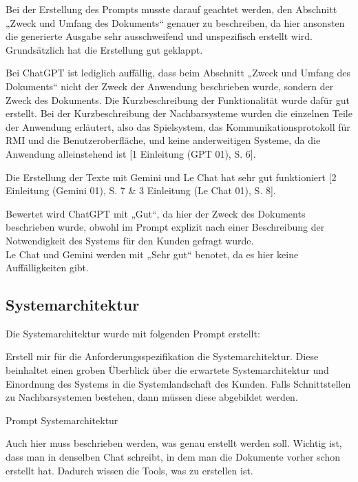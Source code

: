 Bei der Erstellung des Prompts musste darauf geachtet werden, den Abschnitt „Zweck und Umfang des Dokuments“ genauer zu beschreiben, da hier 
ansonsten die generierte Ausgabe sehr ausschweifend und unspezifisch erstellt wird. Grundsätzlich hat die Erstellung gut geklappt.

Bei ChatGPT ist lediglich auffällig, dass beim Abschnitt „Zweck und Umfang des Dokuments“ nicht der Zweck der Anwendung beschrieben wurde, 
sondern der Zweck des Dokuments. Die Kurzbeschreibung der Funktionalität wurde dafür gut erstellt. Bei der Kurzbeschreibung der 
Nachbarsysteme wurden die einzelnen Teile der Anwendung erläutert, also das Spielsystem, das Kommunikationsprotokoll für RMI und die 
Benutzeroberfläche, und keine anderweitigen Systeme, da die Anwendung alleinstehend ist [1 Einleitung (GPT 01), S. 6].

Die Erstellung der Texte mit Gemini und Le Chat hat sehr gut funktioniert [2 Einleitung (Gemini 01), S. 7 \& 3 Einleitung (Le Chat 01), S. 8].

Bewertet wird ChatGPT mit „Gut“, da hier der Zweck des Dokuments beschrieben wurde, obwohl im Prompt explizit nach einer Beschreibung der 
Notwendigkeit des Systems für den Kunden gefragt wurde.\\
Le Chat und Gemini werden mit „Sehr gut“ benotet, da es hier keine Auffälligkeiten gibt.

\subsection*{Systemarchitektur}

Die Systemarchitektur wurde mit folgenden Prompt erstellt:

\begin{prompt}[H]
    \begin{tcolorbox}[colback=gray!20, colframe=gray!20, boxrule=0pt, sharp corners] 
        Erstell mir für die Anforderungsspezifikation die Systemarchitektur. Diese beinhaltet einen groben Überblick über die erwartete Systemarchitektur 
        und Einordnung des Systems in die Systemlandschaft des Kunden. Falls Schnittstellen zu Nachbarsystemen bestehen, dann müssen diese abgebildet werden.
        \vfill
    \end{tcolorbox}
    \caption{Prompt Systemarchitektur}
    \label{Prompt Systemarchitektur}
\end{prompt}

Auch hier muss beschrieben werden, was genau erstellt werden soll. Wichtig ist, dass man in denselben Chat schreibt, in dem man die 
Dokumente vorher schon erstellt hat. Dadurch wissen die Tools, was zu erstellen ist.

